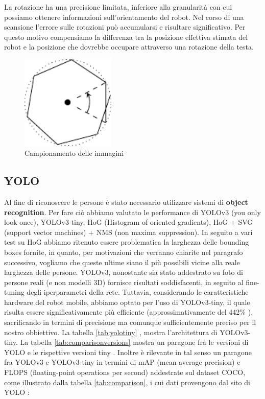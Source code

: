 \documentclass[a4paper]{article}
\begin{document}
	La rotazione ha una precisione limitata, inferiore alla granularità con cui
	possiamo ottenere informazioni sull'orientamento del robot. Nel corso di
	una scansione l'errore sulle rotazioni può accumularsi e risultare
	significativo. Per questo motivo compensiamo la differenza tra la posizione
	effettiva stimata del robot e la posizione che dovrebbe occupare attraverso
	una rotazione della testa.
	
	
	\begin{figure}[H]
		\centering
		\includegraphics[width=0.4\textwidth]{./img/pictures_sampling.pdf}
		\caption{Campionamento delle immagini}
		\label{fig:campionamento_immagini}
	\end{figure}
	
	\subsection{YOLO}\label{subsec:YOLO}
	Al fine di riconoscere le persone è stato necessario utilizzare sistemi di
	\textbf{object recognition}. Per fare ciò abbiamo valutato le performance di
	YOLOv3 (you only look once), YOLOv3-tiny, HoG (Histogram of oriented
	gradients), HoG + SVG (support vector machines) + NMS (non maxima
	suppression).  In seguito a vari test su HoG abbiamo ritenuto essere
	problematica la larghezza delle bounding boxes fornite, in quanto, per
	motivazioni che verranno chiarite nel paragrafo successivo, vogliamo che
	queste ultime siano il più possibili vicine alla reale larghezza delle
	persone. YOLOv3, nonostante sia stato addestrato su foto di persone reali
	(e non modelli 3D) fornisce risultati soddisfacenti, in seguito al
	fine-tuning degli iperparametri della rete. Tuttavia, considerando le
	caratteristiche hardware del robot mobile, abbiamo optato per l'uso di
	YOLOv3-tiny, il quale risulta essere significativamente più efficiente
	(approssimativamente del 442\% \cite{tiny_yolo}), sacrificando in termini
	di precisione ma comunque sufficientemente preciso per il nostro
	obbiettivo. La tabella \ref{tab:yolotiny} \cite{He2019TFYOLOAI}, mostra
	l'architettura di YOLOv3-tiny. La tabella \ref{tab:comparisonversions}
	mostra un paragone fra le versioni di YOLO e le rispettive versioni tiny
	\cite{tiny_yolo}. Inoltre è rilevante in tal senso un paragone fra YOLOv3 e
	YOLOv3-tiny in termini di mAP (mean average precision) e FLOPS
	(floating-point operations per second) addestrate sul dataset COCO, come
	illustrato dalla tabella \ref{tab:comparison}, i cui dati provengono dal
	sito di YOLO \cite{yolo}:
	
\end{document}
